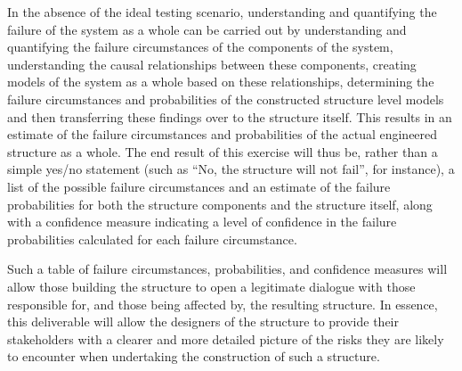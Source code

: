 \newpage\noindent
In the absence of the ideal testing scenario, understanding and quantifying the failure of the system as a whole can be carried out by understanding and quantifying the failure circumstances of the components of the system, understanding the causal relationships between these components, creating models of the system as a whole based on these relationships, determining the failure circumstances and probabilities of the constructed structure level models and then transferring these findings over to the structure itself. This results in an estimate of the failure circumstances and probabilities of the actual engineered structure as a whole.
\newl
The end result of this exercise will thus be, rather than a simple yes/no statement (such as ``No, the structure will not fail'', for instance), a list of the possible failure circumstances and an estimate of the failure probabilities for both the structure components and the structure itself, along with a confidence measure indicating a level of confidence in the failure probabilities calculated for each failure circumstance.
\par Such a table of failure circumstances, probabilities, and confidence measures will allow those building the structure to open a legitimate dialogue with those responsible for, and those being affected by, the resulting structure. In essence, this deliverable will allow the designers of the structure to provide their stakeholders with a clearer and more detailed picture of the risks they are likely to encounter when undertaking the construction of such a structure.
